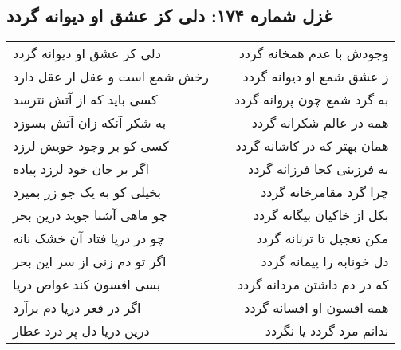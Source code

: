 \begin{center}
\section*{غزل شماره ۱۷۴: دلی کز عشق او دیوانه گردد}
\label{sec:174}
\begin{longtable}{l p{0.5cm} r}
دلی کز عشق او دیوانه گردد
&&
وجودش با عدم همخانه گردد
\\
رخش شمع است و عقل ار عقل دارد
&&
ز عشق شمع او دیوانه گردد
\\
کسی باید که از آتش نترسد
&&
به گرد شمع چون پروانه گردد
\\
به شکر آنکه زان آتش بسوزد
&&
همه در عالم شکرانه گردد
\\
کسی کو بر وجود خویش لرزد
&&
همان بهتر که در کاشانه گردد
\\
اگر بر جان خود لرزد پیاده
&&
به فرزینی کجا فرزانه گردد
\\
بخیلی کو به یک جو زر بمیرد
&&
چرا گرد مقامرخانه گردد
\\
چو ماهی آشنا جوید درین بحر
&&
بکل از خاکیان بیگانه گردد
\\
چو در دریا فتاد آن خشک نانه
&&
مکن تعجیل تا ترنانه گردد
\\
اگر تو دم زنی از سر این بحر
&&
دل خونابه را پیمانه گردد
\\
بسی افسون کند غواص دریا
&&
که در دم داشتن مردانه گردد
\\
اگر در قعر دریا دم برآرد
&&
همه افسون او افسانه گردد
\\
درین دریا دل پر درد عطار
&&
ندانم مرد گردد یا نگردد
\\
\end{longtable}
\end{center}
